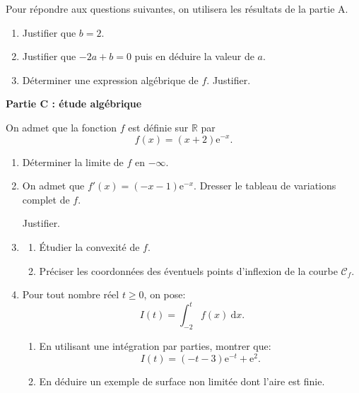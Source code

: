 \documentclass[10pt]{article}
\providecommand{\R}{\mathbb{R}}
\providecommand{\e}{{\mathrm{e}}}
\begin{document}
Pour répondre aux questions suivantes, on utilisera les résultats de la partie A.

\medskip

\begin{enumerate}
\item Justifier que $b = 2$.
\item Justifier que $-2a + b = 0$ puis en déduire la valeur de $a$.
\item Déterminer une expression algébrique de $f$. Justifier.
\end{enumerate}

\medskip

\begin{center}\textbf{Partie C : étude algébrique}\end{center}

On admet que la fonction $f$ est définie sur $\R$ par 
\[f(x) = (x + 2)\e^{-x}.\]

\smallskip

\begin{enumerate}
\item Déterminer la limite de $f$ en $-\infty$.
\item On admet que $f'(x) =(- x - 1)\e^{-x}$. Dresser le tableau de variations complet de $f$.

Justifier.
\item 
	\begin{enumerate}
		\item Étudier la convexité de $f$.
		\item Préciser les coordonnées des éventuels points d'inflexion de la courbe $\mathcal{C}_f$.
	\end{enumerate}
\item Pour tout nombre réel $t \geqslant 0$, on pose:
\[I(t) = \displaystyle\int_{-2}^t f(x)\:\text{d}x.\]

	\begin{enumerate}
		\item En utilisant une intégration par parties, montrer que:
\[I(t) = (- t - 3)\e^{-t} + \e^2.\]

		\item En déduire un exemple de surface non limitée dont l'aire est finie.
	\end{enumerate}
\end{enumerate}
\end{document}
